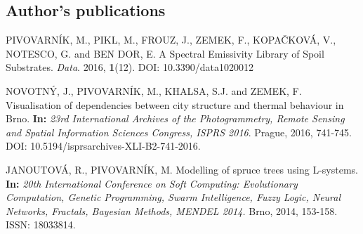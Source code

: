 \begin{thebibliography}{10}


\section*{Author’s publications}

 PIVOVARNÍK, M., PIKL, M., FROUZ, J., ZEMEK, F., KOPAČKOVÁ, V., NOTESCO, G. and BEN DOR, E. A Spectral Emissivity Library of Spoil Substrates. \textit{Data}. 2016, \textbf{1}(12). DOI: 10.3390/data1020012

 NOVOTNÝ, J., PIVOVARNÍK, M., KHALSA, S.J. and ZEMEK, F. Visualisation of dependencies between city structure and thermal behaviour in Brno. \textbf{In:} \textit{23rd International Archives of the Photogrammetry, Remote Sensing and Spatial Information Sciences Congress, ISPRS 2016}. Prague, 2016, 741-745. DOI: 10.5194/isprsarchives-XLI-B2-741-2016.

 JANOUTOVÁ, R., PIVOVARNÍK, M. Modelling of spruce trees using L-systems. \textbf{In:} \textit{20th International Conference on Soft Computing: Evolutionary Computation, Genetic Programming, Swarm Intelligence, Fuzzy Logic, Neural Networks, Fractals, Bayesian Methods, MENDEL 2014.} Brno, 2014, 153-158. ISSN: 18033814. 


\end{thebibliography}
